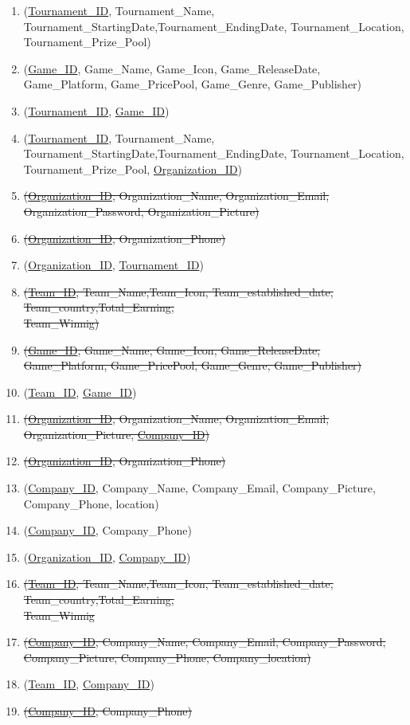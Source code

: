\begin{enumerate}
    \item (\underline{Tournament\_ID}, Tournament\_Name, Tournament\_StartingDate,Tournament\_EndingDate, Tournament\_Location, Tournament\_Prize\_Pool)
    \item (\underline{Game\_ID}, Game\_Name, Game\_Icon, Game\_ReleaseDate, Game\_Platform, Game\_PricePool, Game\_Genre, Game\_Publisher)
    \item (\underline{Tournament\_ID}, \underline{Game\_ID})


    \item (\underline{Tournament\_ID}, Tournament\_Name, Tournament\_StartingDate,Tournament\_EndingDate, Tournament\_Location, Tournament\_Prize\_Pool, \underline{Organization\_ID})
    \item \sout{(\underline{Organization\_ID}, Organization\_Name, Organization\_Email, Organization\_Password, Organization\_Picture)}
    \item \sout{(\underline{Organization\_ID}, Organization\_Phone)}
    \item (\underline{Organization\_ID}, \underline{Tournament\_ID})


    \item \sout{(\underline{Team\_ID}, Team\_Name,Team\_Icon, Team\_established\_date, Team\_country,Total\_Earning,\\Team\_Winnig)}
    \item \sout {(\underline{Game\_ID}, Game\_Name, Game\_Icon, Game\_ReleaseDate, Game\_Platform, Game\_PricePool, Game\_Genre, Game\_Publisher)}
    \item (\underline{Team\_ID}, \underline{Game\_ID})


    \item \sout{(\underline{Organization\_ID}, Organization\_Name, Organization\_Email, Organization\_Picture, \underline{Company\_ID})}
    \item \sout{(\underline{Organization\_ID}, Organization\_Phone)}
    \item (\underline{Company\_ID}, Company\_Name, Company\_Email, Company\_Picture, Company\_Phone, location)
    \item (\underline{Company\_ID}, Company\_Phone)
    \item (\underline{Organization\_ID}, \underline{Company\_ID})


    \item \sout{(\underline{Team\_ID}, Team\_Name,Team\_Icon, Team\_established\_date, Team\_country,Total\_Earning,\\Team\_Winnig}
    \item \sout{(\underline{Company\_ID}, Company\_Name, Company\_Email, Company\_Password, Company\_Picture, Company\_Phone, Company\_location)}
    \item (\underline{Team\_ID}, \underline{Company\_ID})
    \item \sout{(\underline{Company\_ID}, Company\_Phone)}
\end{enumerate}